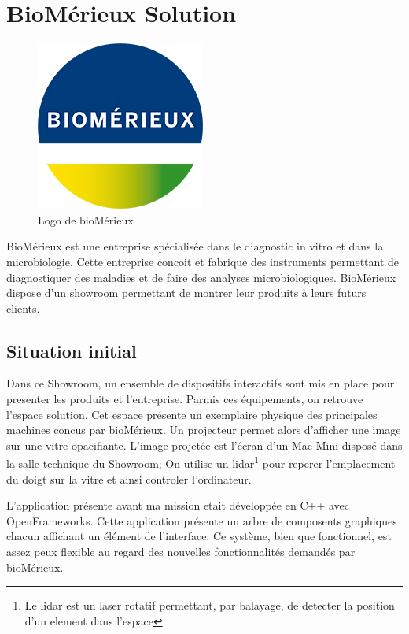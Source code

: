 \section{BioMérieux Solution}

\begin{figure}[h]
    \centering
    \includegraphics[scale=0.5]{img/bmx.png}
    \caption{Logo de bioMérieux}
\end{figure}

BioMérieux est une entreprise spécialisée dans le diagnostic in vitro et dans la microbiologie.
Cette entreprise concoit et fabrique des instruments permettant de diagnostiquer des maladies et de faire des analyses microbiologiques.
BioMérieux dispose d'un showroom permettant de montrer leur produits à leurs futurs clients.

\subsection{Situation initial}

Dans ce Showroom, un ensemble de dispositifs interactifs sont mis en place pour presenter les produits et l'entreprise.
Parmis ces équipements, on retrouve l'espace solution.
Cet espace présente un exemplaire physique des principales machines concus par bioMérieux.
Un projecteur permet alors d'afficher une image sur une vitre opacifiante.
L'image projetée est l'écran d'un Mac Mini disposé dans la salle technique du Showroom;
On utilise un lidar\footnote{Le lidar est un laser rotatif permettant, par balayage, de detecter la position d'un element dans l'espace} pour reperer l'emplacement du doigt sur la vitre et ainsi controler l'ordinateur.

L'application présente avant ma mission etait développée en C++ avec OpenFrameworks.
Cette application présente un arbre de composents graphiques chacun affichant un élément de l'interface.
Ce système, bien que fonctionnel, est assez peux flexible au regard des nouvelles fonctionnalités demandés par bioMérieux.

